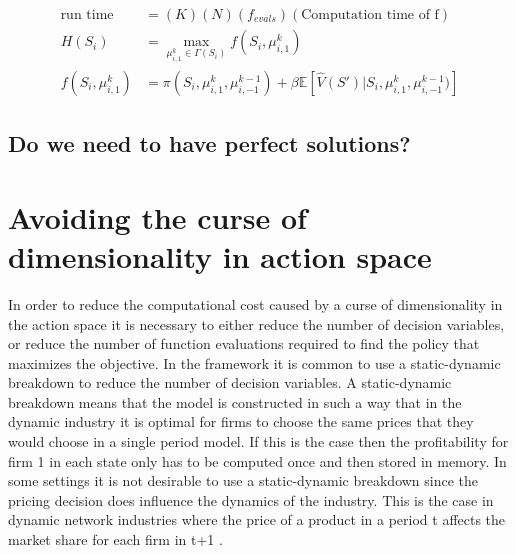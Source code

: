 \documentclass[12pt]{article}
\begin{document}
\begin{align*}
  \text{run time} &= (K)(N)(f_{evals})(\text{Computation time of f})\\
  H(S_i)&=\max_{\mu^k_{i,1} \in \Gamma(S_i)}f(S_i,\mu^k_{i,1})\\
  f(S_i,\mu^k_{i,1})&=\pi(S_i, \mu^k_{i,1}, \mu^{k-1}_{i,-1})+ \beta\mathbb{E}[\hat{V}(S')|S_i,\mu^k_{i,1},\mu^{k-1}_{i,-1})]
\end{align*}

\subsection{Do we need to have perfect solutions?}


\section{Avoiding the curse of dimensionality in action space}
\label{action}

In order to reduce the computational cost caused by a curse of dimensionality in the action space it is necessary to either reduce the number of decision variables, or reduce the number of function evaluations required to find the policy that maximizes the objective. In the \citet{1995_Erickson_Pakes_RES} framework it is common to use a static-dynamic breakdown to reduce the number of decision variables. A static-dynamic breakdown means that the model is constructed in such a way that in the dynamic industry it is optimal for firms to choose the same prices that they would choose in a single period model. If this is the case then the profitability for firm 1 in each state only has to be computed once and then stored in memory. In some settings it is not desirable to use a static-dynamic breakdown since the pricing decision does influence the dynamics of the industry. This is the case in dynamic network industries where the price of a product in a period t affects the market share for each firm in t+1 \citep{2009_Chen_Doraszelski_Harrington, 2006_Mitchell_Skrzypacz, 2006_Chen_Doraszelski}.
\end{document}
